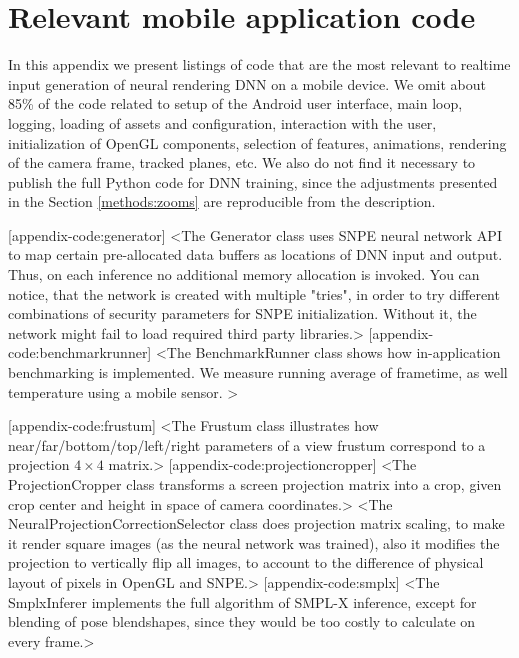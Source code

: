\chapter{Relevant mobile application code}
\label{appendix-code}

In this appendix we present listings of code that are the most relevant to realtime input generation of neural rendering DNN on a mobile device. We omit about 85\% of the code related to setup of the Android user interface, main loop, logging, loading of assets and configuration, interaction with the user, initialization of OpenGL components, selection of features, animations, rendering of the camera frame, tracked planes, etc. We also do not find it necessary to publish the full Python code for DNN training, since the adjustments presented in the Section \ref{methods:zooms} are reproducible from the description.

[appendix-code:generator]
<The Generator class uses SNPE neural network API to map certain pre-allocated data buffers as locations of DNN input and output. Thus, on each inference no additional memory allocation is invoked. You can notice, that the network is created with multiple "tries", in order to try different combinations of security parameters for SNPE initialization. Without it, the network might fail to load required third party libraries.>
[appendix-code:benchmarkrunner]
<The BenchmarkRunner class shows how in-application benchmarking is implemented. We measure running average of frametime, as well temperature using a mobile sensor. >


[appendix-code:frustum]
<The Frustum class illustrates how near/far/bottom/top/left/right parameters of a view frustum correspond to a projection $4\times4$ matrix.>
[appendix-code:projectioncropper]
<The ProjectionCropper class transforms a screen projection matrix into a crop, given crop center and height in space of camera coordinates.>
<The NeuralProjectionCorrectionSelector class does projection matrix scaling, to make it render square images (as the neural network was trained), also it modifies the projection to vertically flip all images, to account to the difference of physical layout of pixels in OpenGL and SNPE.>
[appendix-code:smplx]
<The SmplxInferer implements the full algorithm of SMPL-X inference, except for blending of pose blendshapes, since they would be too costly to calculate on every frame.>

